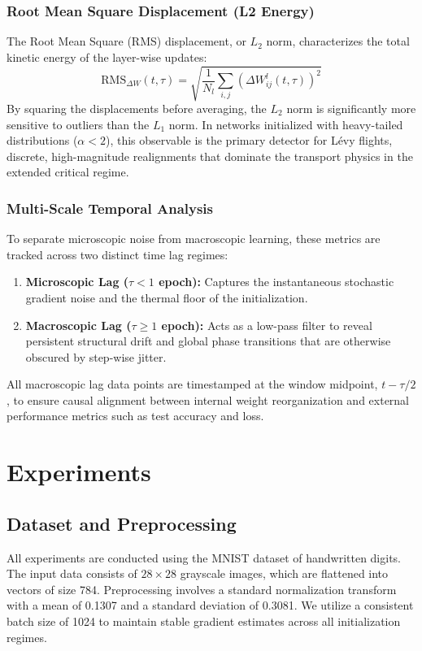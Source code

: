 \documentclass[11pt,a4paper]{article}
\begin{document}
\subsubsection{Root Mean Square Displacement (L2 Energy)}
The Root Mean Square (RMS) displacement, or $L_2$ norm, characterizes the total kinetic energy of the layer-wise updates:
\begin{equation}
    \text{RMS}_{\Delta W}(t, \tau) = \sqrt{\frac{1}{N_l} \sum_{i,j} \left( \Delta W^l_{ij}(t, \tau) \right)^2}
\end{equation}
By squaring the displacements before averaging, the $L_2$ norm is significantly more sensitive to outliers than the $L_1$ norm. In networks initialized with heavy-tailed distributions ($\alpha < 2$), this observable is the primary detector for Lévy flights, discrete, high-magnitude realignments that dominate the transport physics in the extended critical regime.

\subsubsection{Multi-Scale Temporal Analysis}
To separate microscopic noise from macroscopic learning, these metrics are tracked across two distinct time lag regimes:
\begin{enumerate}
    \item \textbf{Microscopic Lag ($\tau < 1$ epoch):} Captures the instantaneous stochastic gradient noise and the thermal floor of the initialization.
    \item \textbf{Macroscopic Lag ($\tau \geq 1$ epoch):} Acts as a low-pass filter to reveal persistent structural drift and global phase transitions that are otherwise obscured by step-wise jitter.
\end{enumerate}

All macroscopic lag data points are timestamped at the window midpoint, $t - \tau/2$, to ensure causal alignment between internal weight reorganization and external performance metrics such as test accuracy and loss.
\section{Experiments}
\subsection{Dataset and Preprocessing}
All experiments are conducted using the MNIST dataset of handwritten digits. The input data consists of $28 \times 28$ grayscale images, which are flattened into vectors of size 784. Preprocessing involves a standard normalization transform with a mean of 0.1307 and a standard deviation of 0.3081. We utilize a consistent batch size of 1024 to maintain stable gradient estimates across all initialization regimes.
\end{document}
